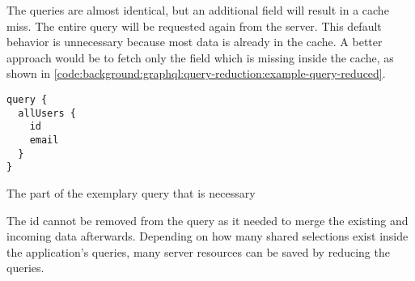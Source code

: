 \noindent The queries are almost identical, but an additional field will result in a cache miss. The entire query will be requested again from the server. This default behavior is unnecessary because most data is already in the cache. A better approach would be to fetch only the field which is missing inside the cache, as shown in \ref{code:background:graphql:query-reduction:example-query-reduced}.

\ifshowListings
\begin{listing}[H]
    \begin{verbatim}
query {
  allUsers {
    id
    email
  }
}
    \end{verbatim}
    \caption{The part of the exemplary query that is necessary}\label{code:background:graphql:query-reduction:example-query-reduced}
\end{listing}
\fi

\noindent The id cannot be removed from the query as it needed to merge the existing and incoming data afterwards. Depending on how many shared selections exist inside the application's queries, many server resources can be saved by reducing the queries.
